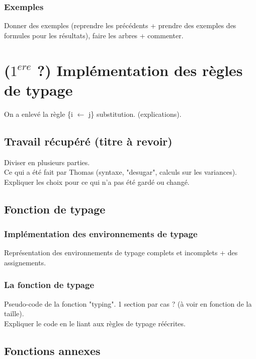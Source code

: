 \documentclass[11pt,a4paper]{article}
\begin{document}
\subsubsection{Exemples}

Donner des exemples (reprendre les précédents + prendre des exemples des formules pour les résultats), faire les arbres + commenter.

\section{($1^{ere}$ ?) Implémentation des règles de typage}

On a enlevé la règle \{i $\longleftarrow$ j\} substitution. (explications).


\subsection{Travail récupéré (titre à revoir)}

Diviser en plusieurs parties.
\\
Ce qui a été fait par Thomas (syntaxe, "desugar", calculs sur les variances). 
\\
Expliquer les choix pour ce qui n'a pas été gardé ou changé. 

\subsection{Fonction de typage}

\subsubsection{Implémentation des environnements de typage}

Représentation des environnements de typage complets et incomplets + des assignements. 

\subsubsection{La fonction de typage}

Pseudo-code de la fonction "typing". 
1 section par cas ? (à voir en fonction de la taille).
\\
Expliquer le code en le liant aux règles de typage réécrites. 

\subsection{Fonctions annexes}
\end{document}
